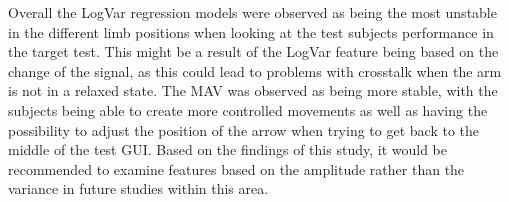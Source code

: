 	Overall the LogVar regression models were observed as being the most unstable in the different limb positions when looking at the test subjects performance in the target test. This might be a result of the LogVar feature being based on the change of the signal, as this could lead to problems with crosstalk when the arm is not in a relaxed state. The MAV was observed as being more stable, with the subjects being able to create more controlled movements as well as having the possibility to adjust the position of the arrow when trying to get back to the middle of the test GUI. Based on the findings of this study, it would be recommended to examine features based on the amplitude rather than the variance in future studies within this area.
	
	
	
	
	
